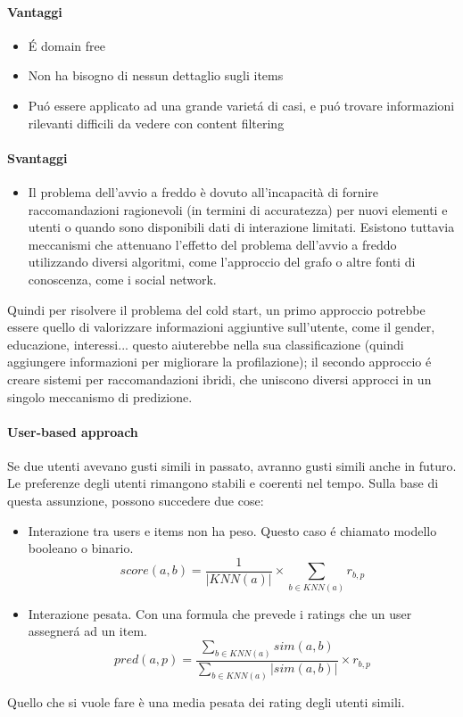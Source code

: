 \paragraph{Vantaggi} 
\begin{itemize}
    \item É domain free
    \item Non ha bisogno di nessun dettaglio sugli items
    \item Puó essere applicato ad una grande varietá di casi, e puó trovare informazioni rilevanti difficili da vedere con content filtering
\end{itemize}

\paragraph{Svantaggi}
\begin{itemize}
    \item Il problema dell'avvio a freddo è dovuto all'incapacità di fornire raccomandazioni ragionevoli (in termini di accuratezza) per nuovi elementi e utenti o quando sono disponibili dati di interazione limitati. Esistono tuttavia meccanismi che attenuano l'effetto del problema dell'avvio a freddo utilizzando diversi algoritmi, come l'approccio del grafo o altre fonti di conoscenza, come i social network.
\end{itemize}
Quindi per risolvere il problema del cold start, un primo approccio potrebbe essere quello di valorizzare informazioni aggiuntive sull'utente, come il gender, educazione, interessi... questo aiuterebbe nella sua classificazione (quindi aggiungere informazioni per migliorare la profilazione); il secondo approccio é creare sistemi per raccomandazioni ibridi, che uniscono diversi approcci in un singolo meccanismo di predizione.

\paragraph{User-based approach} Se due utenti avevano gusti simili in passato, avranno gusti simili anche in futuro. Le preferenze degli utenti rimangono stabili e coerenti nel tempo. Sulla base di questa assunzione, possono succedere due cose:
\begin{itemize}
    \item Interazione tra users e items non ha peso. Questo caso é chiamato modello booleano o binario. 
       \[
    score(a,b) = \frac{1}{|KNN(a)|} \times \sum_{b\in KNN(a)} r_{b,p}
    \]
    \item Interazione pesata. Con una formula che prevede i ratings che un user assegnerá ad un item. 
    \[
    pred(a,p) = \frac{\sum_{b\in KNN(a)} sim(a,b)}{\sum_{b\in KNN(a)} |sim (a,b)|} \times r_{b,p}
    \]
\end{itemize}
Quello che si vuole fare è una media pesata dei rating degli utenti simili.

